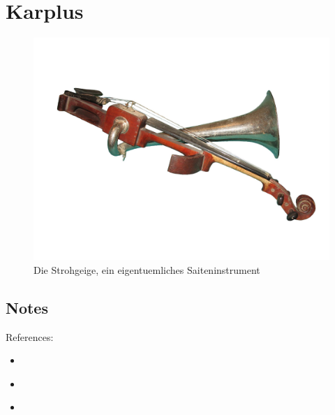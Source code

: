 \chapter{Karplus}
\label{Karplus}



\begin{figure}[h]
  \begin{center}
    \includegraphics[width = 14cm]{img/strohgeige.jpg}
    \caption{Die Strohgeige, ein eigentuemliches Saiteninstrument}
    \label{fig:metering}
  \end{center}
\end{figure}


\section{Notes}

References:
\begin{itemize}
  \item \cite{bilbao_numerical_2009}
  \item \cite{smith_physical_2010}
  \item \cite{cook_real_2002}
\end{itemize}






